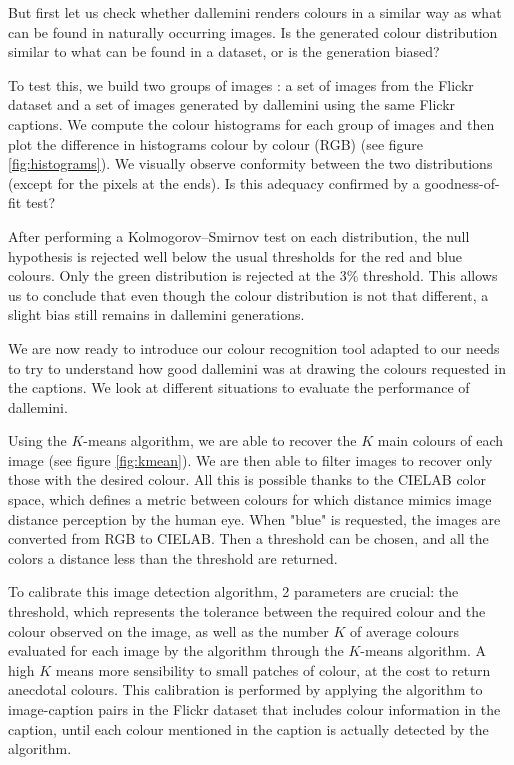 \documentclass{article}
\begin{document}
\begin{multicols}{2}
But first let us check whether \gls{dallemini} renders colours in a similar way as what can be found in naturally occurring images.  Is the generated colour distribution similar to what can be found in a dataset, or is the generation biased?

To test this, we build two groups of images : a set of images from the Flickr dataset and a set of images generated by \gls{dallemini} using the same Flickr captions. We compute the colour histograms for each group of images and then plot the difference in histograms colour by colour (RGB) (see figure \ref{fig:histograms}). We visually observe conformity between the two distributions (except for the pixels at the ends). Is this adequacy confirmed by a goodness-of-fit test?

After performing a Kolmogorov–Smirnov test on each distribution, the null hypothesis is rejected well below the usual thresholds for the red and blue colours. Only the green distribution is rejected at the 3\% threshold. This allows us to conclude that even though the colour distribution is not that different, a slight bias still remains in \gls{dallemini} generations.

We are now ready to introduce our colour recognition tool adapted to our needs to try to understand how good \gls{dallemini} was at drawing the colours requested in the captions. We look at different situations to evaluate the performance of \gls{dallemini}. %

Using the $K$-means algorithm, we are able to recover the $K$ main colours of each image (see figure \ref{fig:kmean}). We are then able to filter images to recover only those with the desired colour. All this is possible thanks to the CIELAB color space, which defines a metric between colours for which distance mimics image distance perception by the human eye. When "blue" is requested, the images are converted from RGB to CIELAB. Then a threshold can be chosen, and all the colors a distance less than the threshold are returned.

To calibrate this image detection algorithm, 2 parameters are crucial: the threshold, which represents the tolerance between the required colour and the colour observed on the image, as well as the number $K$ of average colours evaluated for each image by the algorithm through the $K$-means algorithm. A high $K$ means more sensibility to small patches of colour, at the cost to return anecdotal colours. This calibration is performed by applying the algorithm to image-caption pairs in the Flickr dataset that includes colour information in the caption, until each colour mentioned in the caption is actually detected by the algorithm.


\end{multicols}
\end{document}

